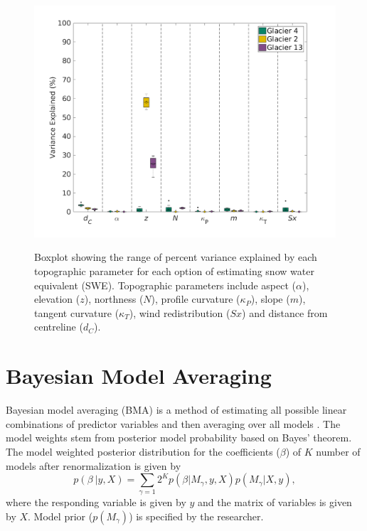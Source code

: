 \documentclass[12pt]{article}
\begin{document}
\begin{figure}
	\centering
	\includegraphics[width =1.1 \textwidth]{Coeffs_DensityOpts.png}\\
	\caption{Boxplot showing the range of percent variance explained by each topographic parameter for each option of estimating snow water equivalent (SWE). Topographic parameters include aspect ($\alpha$), elevation ($z$), northness ($N$), profile curvature ($\kappa_P$), slope ($m$), tangent curvature ($\kappa_T$), wind redistribution ($Sx$) and distance from centreline ($d_C$).}
	\label{sampledRange:Sx}
\end{figure} 




\section{Bayesian Model Averaging}
\label{sec:BMS}

Bayesian model averaging (BMA) is a method of estimating all possible linear combinations of predictor variables and then averaging over all models \citep{Raftery1997, Wasserman2000, Raftery2005}. The model weights stem from posterior model probability based on Bayes' theorem. The model weighted posterior distribution for the coefficients ($\beta$) of $K$ number of models after renormalization is given by \citep{Raftery1997}
\begin{equation}
p(\beta\ | y,X) = \sum\limits_{\gamma=1} 2^K p(\beta | M_\gamma , y, X)p(M_\gamma | X,y),
\end{equation}
where the responding variable is given by $y$ and the matrix of variables is given by $X$. Model prior ($p(M_\gamma)$) is specified by the researcher.
\end{document}
